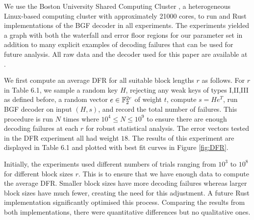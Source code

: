 
We use the Boston University Shared Computing Cluster \cite{SCC}, a heterogeneous Linux-based computing cluster with approximately 21000 cores, to run \SageMath{} and Rust implementations of the BGF decoder in all experiments. The experiments yielded a graph with both the waterfall and error floor regions for our parameter set in addition to many explicit examples of decoding failures that can be used for future analysis. All raw data and the decoder used for this paper are available at \cite{raw-data-decoder}.

We first compute an average DFR for all suitable block lengths $r$ as follows.  For $r$ in Table 6.1, we sample a random key $H$, rejecting any weak keys of types I,II,III as defined before, a random vector $e \in \mathbb{F}_2^{2r}$ of weight $t$, compute $s=He^T$, run BGF decoder on input $(H, s)$, and record the total number of failures.  This procedure is run $N$ times where $10^4 \le N \le 10^9$ to ensure there are enough decoding failures at each $r$ for robust statistical analysis.
The error vectors tested in the DFR experiment all had weight $18$. The results of this experiment are displayed in Table 6.1 and plotted with best fit curves in Figure \ref{fig:DFR}.

\begin{remark}
Initially, the \SageMath{} experiments used different numbers of trials ranging from $10^3$ to $10^8$ for different block sizes $r$. This is to ensure that we have enough data to compute the average DFR. Smaller block sizes have more decoding failures whereas larger block sizes have much fewer, creating the need for this adjustment. A future Rust implementation significantly optimised this process. Comparing the results from both implementations, there were quantitative differences but no qualitative ones.
\end{remark}

